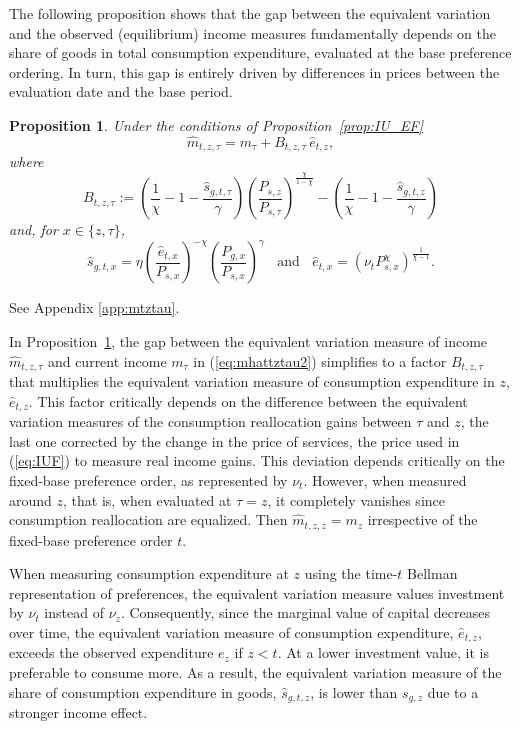 \documentclass[12pt,a4paper]{article}
\newtheorem{proposition}{Proposition}
\newcommand{\red}[1]{\textcolor{red}{#1}} %
\begin{document}
The following proposition shows that the gap between the equivalent variation and the observed (equilibrium) income measures fundamentally depends on the share of goods in total consumption expenditure, evaluated at the base preference ordering. In turn, this gap is entirely driven by differences in prices between the evaluation date and the base period.

\begin{proposition}\label{prop:mtztau}
Under the conditions of Proposition~\ref{prop:IU_EF}
\[
\widehat{m}_{t,z,\tau} = m_{\tau} + B_{t,z,\tau} \,  \widehat e_{t,z},
\]
where
\[
B_{t,z,\tau} :=  \left(\frac{1}{\chi} - 1 - \frac{\widehat{s}_{g,t,\tau}}{\gamma} \right)  \left( \frac{P_{s,z}}{P_{s,\tau}} \right)^{\frac{\chi}{1 - \chi}}  
-  \left(\frac{1}{\chi} - 1 - \frac{\widehat{s}_{g,t,z}}{\gamma} \right)
\]
and, for $x\in\{z,\tau\}$,
\[
\widehat s_{g,t,x}  = \eta \left( \frac{\widehat e_{t,x}}{P_{s,x}} \right)^{-\chi} \left( \frac{P_{g,x}}{P_{s,x}} \right)^\gamma 
\ \ \ \ \text{and}\ \ \ \ 
 \widehat e_{t,x} = \left( \nu_t P_{s,x}^\chi \right)^{\frac{1}{\chi - 1}}  .
 \]
\end{proposition}
 See Appendix \ref{app:mtztau}.


In Proposition~\ref{prop:mtztau}, the gap between the equivalent variation measure of income $\widehat m_{t,z,\tau}$ and current income $m_\tau$  in (\ref{eq:mhattztau2}) simplifies to a factor $B_{t,z,\tau}$ that multiplies the equivalent variation measure of consumption expenditure in $z$, $\widehat e_{t,z}$. This factor critically depends on the difference between the equivalent variation measures of the consumption reallocation gains between $\tau$ and $z$, the last one corrected by the change in the price of services, the price used in (\ref{eq:IUF}) to measure real income gains. This deviation depends critically on the fixed-base preference order, as represented by $\nu_t$. 
However, when measured around $z$, that is, when evaluated at $\tau = z$, it completely vanishes since consumption reallocation are equalized. Then $\widehat m_{t,z,z} = m_z$ irrespective of the fixed-base preference order $t$.

When measuring consumption expenditure at \( z \) using the time-\( t \) Bellman representation of preferences, the equivalent variation measure values investment by \( \nu_t \) instead of \( \nu_z \).  
Consequently, since the marginal value of capital decreases over time, the equivalent variation measure of consumption expenditure, \( \widehat{e}_{t,z} \), exceeds the observed expenditure \( e_z \) if $z<t$.  
At a lower investment value, it is preferable to consume more.
As a result, the equivalent variation measure of the share of consumption expenditure in goods, \( \widehat{s}_{g,t,z} \), is lower than \( s_{g,z} \) due to a stronger income effect.
\end{document}
